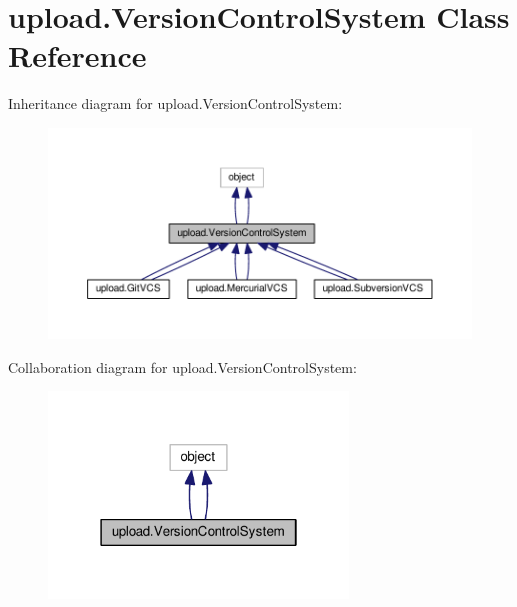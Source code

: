 \hypertarget{classupload_1_1VersionControlSystem}{}\section{upload.\+Version\+Control\+System Class Reference}
\label{classupload_1_1VersionControlSystem}


Inheritance diagram for upload.\+Version\+Control\+System\+:
\nopagebreak
\begin{figure}[H]
\begin{center}
\leavevmode
\includegraphics[width=350pt]{classupload_1_1VersionControlSystem__inherit__graph}
\end{center}
\end{figure}


Collaboration diagram for upload.\+Version\+Control\+System\+:
\nopagebreak
\begin{figure}[H]
\begin{center}
\leavevmode
\includegraphics[width=226pt]{classupload_1_1VersionControlSystem__coll__graph}
\end{center}
\end{figure}
